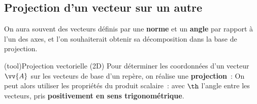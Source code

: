 \documentclass[../../main/main.tex]{subfiles}
\begin{document}
\subsection{Projection d'un vecteur sur un autre}
On aura souvent des vecteurs définis par une \textbf{norme} et un \textbf{angle}
par rapport à l'un des axes, et l'on souhaiterait obtenir sa décomposition dans
la base de projection.
\begin{tcb*}[sidebyside, righthand ratio=.3](tool){Projection vectorielle (2D)}
	Pour déterminer les coordonnées d'un vecteur $\vv{A}$ sur les vecteurs de base
	d'un repère, on réalise une \textbf{projection}~:
	\psw{%
		\[
			\vv{A}\!\cdot\!\!\ux = A_x
			\qet
			\vv{A}\!\cdot\!\!\uy = A_y
		\]
	}%
	On peut alors utiliser les propriétés du produit scalaire~:
	\psw{%
		\[
			\vv{A}\cdot \vv{B} = \norm{\vv{A}}\norm{\vv{B}}\cos(\theta)
		\]
	}%
	avec $\th$ l'angle entre les vecteurs, pris \textbf{positivement en sens
		trigonométrique}.
	\tcblower
	\begin{center}
\end{center}
\end{tcb*}
\end{document}

